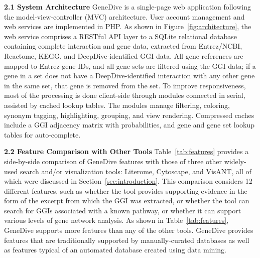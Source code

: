 \documentclass{ws-procs11x85}
\begin{document}
\noindent \textbf{2.1  System Architecture} \newline
\noindent GeneDive is a single-page web application following the model-view-controller (MVC) architecture. User account management and web services are implemented in PHP. As shown in Figure~\ref{fig:architecture}, the web service comprises a RESTful API layer to a SQLite relational database containing complete interaction and gene data, extracted from Entrez/NCBI, Reactome, KEGG, and DeepDive-identified GGI data. All gene references are mapped to Entrez gene IDs, and all gene sets are filtered using the GGI data; if a gene in a set does not have a DeepDive-identified interaction with any other gene in the same set, that gene is removed from the set. To improve responsiveness, most of the processing is done client-side through modules connected in serial, assisted by cached lookup tables. The modules manage filtering, coloring, synonym tagging, highlighting, grouping, and view rendering. Compressed caches include a GGI adjacency matrix with probabilities, and gene and gene set lookup tables for auto-complete. \newline

\noindent \textbf{2.2 Feature Comparison with Other Tools} \newline 
\noindent Table~\ref{tab:features} provides a side-by-side comparison of GeneDive features with those of three other widely-used search and/or visualization tools: Literome, Cytoscape, and VisANT, all of which were discussed in Section~\ref{sec:introduction}.  This comparison considers 12 different features, such as whether the tool provides supporting evidence in the form of the excerpt from which the GGI was extracted, or whether the tool can search for GGIs associated with a known pathway, or whether it can support various levels of gene network analysis. As shown in Table~\ref{tab:features}, GeneDive supports more features than any of the other tools. GeneDive provides features that are traditionally supported by manually-curated databases as well as features typical of an automated database created using data mining.  
\end{document}
